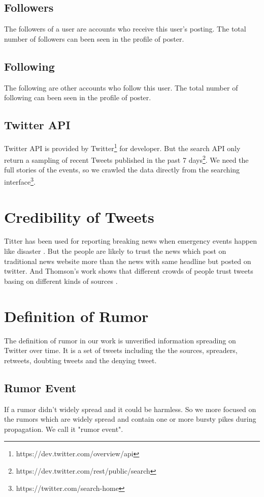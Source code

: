 \subsection{Followers}
The followers of a user are accounts who receive this user's posting. The total number of followers can been seen in the profile of poster.
\subsection{Following}
The following are other accounts who follow this user. The total number of following can been seen in the profile of poster.
\subsection{Twitter API}
\label{tapi}
Twitter API is provided by Twitter\footnote{https://dev.twitter.com/overview/api} for developer. But the search API only return a sampling of recent Tweets published in the past 7 days\footnote{https://dev.twitter.com/rest/public/search}. We need the full stories of the events, so we crawled the data directly from the searching interface\footnote{https://twitter.com/search-home}.
\section{Credibility of Tweets } %
Titter has been used for reporting breaking news when emergency events happen like disaster \cite{kwak2010twitter}. But the people are likely to trust the news which post on traditional news website more than the news with same headline but posted on twitter\cite{java2007we}. And Thomson's work shows that different crowds of people trust tweets basing on different kinds of sources \cite{thomson2012trusting}.
 \section{Definition of Rumor}
 The definition of rumor in our work is unverified information spreading on Twitter over time. It is a set of tweets including the the sources, spreaders, retweets, doubting  tweets and the denying tweet. 
 \subsection{Rumor Event}
 If a rumor didn't widely spread and it could be harmless. So we more focused on the rumors which are widely spread and contain one or more bursty pikes during propagation. We call it "rumor event".
